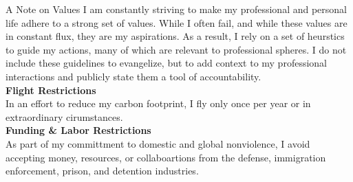 \documentclass{resume} %
\begin{document}
\begin{rSection}{A Note on Values}
I am constantly striving to make my professional and personal life adhere to a strong set of values. While I often fail, and while these values are in constant flux, they are my aspirations. As a result, I rely on a set of heurstics to guide my actions, many of which are relevant to professional spheres. I do not include these guidelines to evangelize, but to add context to my professional interactions and publicly state them a tool of accountability. \\

{\bf Flight Restrictions} \\  
In an effort to reduce my carbon footprint, I fly only once per year or in extraordinary cirumstances. \\

{\bf Funding \& Labor Restrictions} \\
As part of my committment to domestic and global nonviolence, I avoid accepting money, resources, or collaboartions from the defense, immigration enforcement, prison, and detention industries. \\


\end{rSection}





\end{document}
